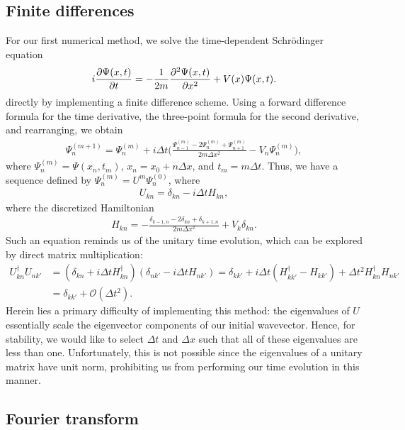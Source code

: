 \subsection{Finite differences}
\label{ssec:finite-differences}

For our first numerical method, we solve the time-dependent Schr\"{o}dinger equation 
\begin{align}
    i \pdv{\Psi(x,t)}{t} = -\frac{1}{2m} \pdv[2]{\Psi(x,t)}{x} + V(x) \Psi(x,t)
.\end{align}
directly by implementing a finite difference scheme.
Using a forward difference formula for the time derivative, the three-point formula for the second derivative, and rearranging, we obtain
\begin{align}
    \Psi_{n}^{(m + 1)} = \Psi_{n}^{(m)} + i \Delta t \Bigg( \frac{\Psi_{n-1}^{(m)} - 2 \Psi_{n}^{(m)} + \Psi_{n+1}^{(m)}}{2m \Delta x^2} - V_{n} \Psi_{n}^{(m)} \Bigg)
,\end{align}
where $\Psi_{n}^{(m)} = \Psi(x_n,t_{m})$, $x_{n} = x_0 + n \Delta x$, and $t_{m} = m \Delta t$.
Thus, we have a sequence defined by $\Psi_{n}^{(m)} = U^{m} \Psi_{n}^{(0)}$, where
\begin{align}
    U_{kn} = \delta_{kn} - i \Delta t H_{kn}
,\end{align}
where the discretized Hamiltonian
\begin{align}
    H_{kn} = -\frac{\delta_{k-1,n} - 2 \delta_{kn} + \delta_{k+1,n}}{2m \Delta x^2} + V_{k} \delta_{kn}
.\end{align}
Such an equation reminds us of the unitary time evolution, which can be explored by direct matrix multiplication:
\begin{align}
    U_{kn}^{\dagger} U_{nk'} &= ( \delta_{kn} + i \Delta t H_{kn}^{\dagger} ) ( \delta_{nk'} - i \Delta t H_{nk'} ) = \delta_{k k'} + i \Delta t ( H_{kk'}^{\dagger} - H_{kk'} ) + \Delta t^2 H_{kn}^{\dagger} H_{nk'} \nonumber \\
    &= \delta_{kk'} + \mathcal{O}(\Delta t^2)
.\end{align}
Herein lies a primary difficulty of implementing this method: the eigenvalues of $U$ essentially scale the eigenvector components of our initial wavevector.
Hence, for stability, we would like to select $\Delta t$ and $\Delta x$ such that all of these eigenvalues are less than one.
Unfortunately, this is not possible since the eigenvalues of a unitary matrix have unit norm, prohibiting us from performing our time evolution in this manner.


\subsection{Fourier transform}

